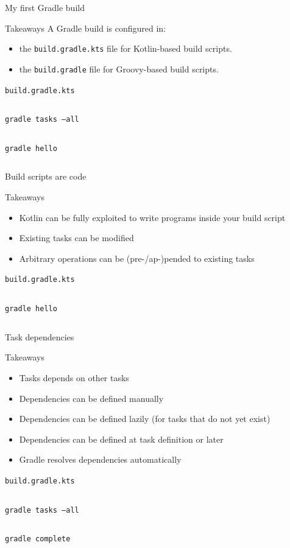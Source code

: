 \documentclass[presentation]{beamer}
\newcommand{\codefile}[4]{
	\begin{block}{\texttt{#2}}
		\inputminted[fontsize=#3,linenos=true,breaklines=true]{#4}{"workspace/#1/#2"}
	\end{block}
}
\newcommand{\kotlin}[3]{\codefile{#1}{#2}{#3}{kotlin}}
\newcommand{\terminal}[3]{\codefile{#1}{#2}{#3}{text}}
\newcommand{\tinier}{\fontsize{4pt}{5pt}\selectfont}
\begin{document}
\begin{frame}{My first Gradle build}
    \begin{block}{Takeaways}
        A Gradle build is configured in:
        \begin{itemize}
            \item the \texttt{build.gradle.kts} file for Kotlin-based build scripts.
            \item the \texttt{build.gradle} file for Groovy-based build scripts.
        \end{itemize}
    \end{block}
    \kotlin{02-SimpleTask}{build.gradle.kts}{\normalsize}
    \terminal{02-SimpleTask}{gradle tasks --all}{\tinier} 
    \terminal{02-SimpleTask}{gradle hello}{\normalsize}
\end{frame}

\begin{frame}{Build scripts are code}
    \begin{block}{Takeaways}
        \begin{itemize}
            \item Kotlin can be fully exploited to write programs inside your build script
            \item Existing tasks can be modified
            \item Arbitrary operations can be (pre-/ap-)pended to existing tasks
        \end{itemize}
    \end{block}
    \kotlin{03-BuildAsCode}{build.gradle.kts}{\normalsize}
    \terminal{03-BuildAsCode}{gradle hello}{\normalsize}
\end{frame}

\begin{frame}{Task dependencies}
    \begin{block}{Takeaways}
        \begin{itemize}
            \item Tasks depends on other tasks
            \item Dependencies can be defined manually
            \item Dependencies can be defined lazily (for tasks that do not yet exist)
            \item Dependencies can be defined at task definition or later
            \item Gradle resolves dependencies automatically
        \end{itemize}
    \end{block}
    \kotlin{04-TaskDependencies}{build.gradle.kts}{\scriptsize}
    \terminal{04-TaskDependencies}{gradle tasks --all}{\tinier}
    \terminal{04-TaskDependencies}{gradle complete}{\normalsize}
\end{frame}
\end{document}
